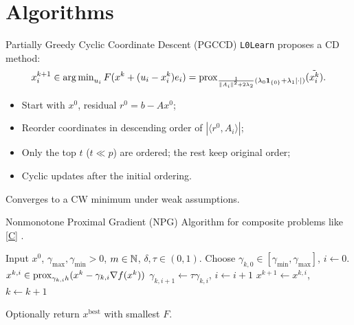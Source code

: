 \section{Algorithms}

\begin{frame}{Partially Greedy Cyclic Coordinate Descent (PGCCD)}
\texttt{L0Learn} \cite{fastselect} proposes a CD method:
\[
x^{k+1}_i \in \operatorname{arg\,min}_{u_i} F(x^k + (u_i-x_i^k)e_i)
= \operatorname{prox}_{\frac{1}{\|A_i\|^2+2\lambda_2} (\lambda_0\mathbf{1}_{\{0\}}+\lambda_1|\cdot|)}(\tilde{x_i^k}).
\]
\begin{itemize}
\item Start with $x^0$, residual $r^0 = b - Ax^0$;
\item Reorder coordinates in descending order of $|\langle r^0, A_i \rangle|$;
\item Only the top $t$ ($t \ll p$) are ordered; the rest keep original order;
\item Cyclic updates after the initial ordering.
\end{itemize}
Converges to a CW minimum under weak assumptions.
\end{frame}

\begin{frame}{Nonmonotone Proximal Gradient (NPG)}
Algorithm for composite problems like \eqref{C} \cite{kanzow2021}.
\begin{algorithmic}[1]
\State Input $x^0$, $\gamma_{\max},\gamma_{\min}>0$, $m\in\mathbb{N}$, $\delta,\tau\in(0,1)$.
\Repeat
\State Choose $\gamma_{k,0} \in [\gamma_{\min},\gamma_{\max}]$, $i\gets0$.
\State $x^{k,i} \in \operatorname{prox}_{\gamma_{k,i} h}(x^k - \gamma_{k,i}\nabla f(x^k))$
\State $\gamma_{k,i+1} \gets \tau \gamma_{k,i}$, $i \gets i+1$
\EndWhile
\State $x^{k+1} \gets x^{k,i}$, $k \gets k+1$
\end{algorithmic}
Optionally return $x^{\text{best}}$ with smallest $F$.
\end{frame}

